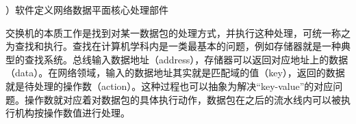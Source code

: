 %
%
%
%






{）软件定义网络数据平面核心处理部件}


交换机的本质工作是找到对某一数据包的处理方式，并执行这种处理，可统一称之为查找和执行。查找在计算机学科内是一类最基本的问题，例如存储器就是一种典型的查找系统。总线输入数据地址（address），存储器可以返回对应地址上的数据（data）。在网络领域，输入的数据地址其实就是匹配域的值（key），返回的数据就是待处理的操作数（action）。这种过程也可以抽象为解决“key-value”的对应问题。操作数就对应着对数据包的具体执行动作，数据包在之后的流水线内可以被执行机构按操作数值进行处理。

